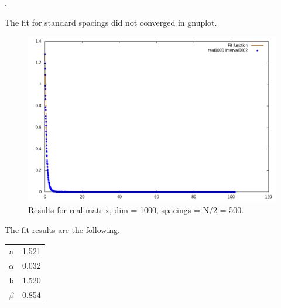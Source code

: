 \documentclass[12pt, a4paper, notitlepage]{report}
\begin{document}

\newpage

.

\vspace{10cm}

The fit for standard spacings did not converged in gnuplot.

\newpage

\begin{figure}[H]
	\centering
	\includegraphics[scale=0.6]{./Real_1000/hist_interval_0500_fit.png}
	\caption{Results for real matrix, dim = 1000, spacings = N/2 = 500.}
	\label{figure_lambdas}
\end{figure}


The fit results are the following.

\begin{table}[H]
	\centering
	\begin{tabular}{|c|c|}
		
		\hline
   
		a			& 1.521	\\
		$\alpha$	& 0.032	\\
		b			& 1.520	\\
		$\beta$		& 0.854	\\
		
		\hline
		
	\end{tabular}
\end{table}

\newpage
\end{document}
